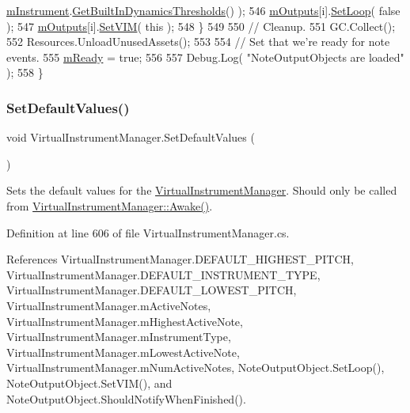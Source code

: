 \begin{DoxyCode}
      \hyperlink{group___v_i_m_priv_gaed435d1f9be09864846db4322dc21fd1}{mInstrument}.\hyperlink{group___v_i_base_pub_func_gac8fc20c49c1b97b6787ed1b3e0073a7f}{GetBuiltInDynamicsThresholds}() );
546             \hyperlink{group___v_i_m_priv_ga53f837fd01475fa35629a650e7fa00e3}{mOutputs}[i].\hyperlink{group___n_o_o_pub_func_ga7b79bbd2c7a68831b322edff140f29d2}{SetLoop}( \textcolor{keyword}{false} );
547             \hyperlink{group___v_i_m_priv_ga53f837fd01475fa35629a650e7fa00e3}{mOutputs}[i].\hyperlink{group___n_o_o_pub_func_gaca261a6f8d95fc7f81bbc3c8108bad58}{SetVIM}( \textcolor{keyword}{this} );
548         \}
549 
550         \textcolor{comment}{// Cleanup.}
551         GC.Collect();
552         Resources.UnloadUnusedAssets();
553 
554         \textcolor{comment}{// Set that we're ready for note events.}
555         \hyperlink{group___v_i_m_priv_ga983a11920bf16794735cc193c327ac42}{mReady} = \textcolor{keyword}{true};
556 
557         Debug.Log( \textcolor{stringliteral}{"NoteOutputObjects are loaded"} );
558     \}
\end{DoxyCode}
\mbox{\label{group___v_i_m_priv_func_gaa9e05e51f025afb0ab5cb2a8532c8bba}} 
\subsubsection{\texorpdfstring{Set\+Default\+Values()}{SetDefaultValues()}}
{\footnotesize\ttfamily void Virtual\+Instrument\+Manager.\+Set\+Default\+Values (\begin{DoxyParamCaption}{ }\end{DoxyParamCaption})\hspace{0.3cm}{\ttfamily [private]}}



Sets the default values for the \hyperlink{class_virtual_instrument_manager}{Virtual\+Instrument\+Manager}. Should only be called from \hyperlink{group___v_i_m_unity_gab92bac4e22476ffe39fc40f49fbd6ae5}{Virtual\+Instrument\+Manager\+::\+Awake()}. 



Definition at line 606 of file Virtual\+Instrument\+Manager.\+cs.



References Virtual\+Instrument\+Manager.\+D\+E\+F\+A\+U\+L\+T\+\_\+\+H\+I\+G\+H\+E\+S\+T\+\_\+\+P\+I\+T\+CH, Virtual\+Instrument\+Manager.\+D\+E\+F\+A\+U\+L\+T\+\_\+\+I\+N\+S\+T\+R\+U\+M\+E\+N\+T\+\_\+\+T\+Y\+PE, Virtual\+Instrument\+Manager.\+D\+E\+F\+A\+U\+L\+T\+\_\+\+L\+O\+W\+E\+S\+T\+\_\+\+P\+I\+T\+CH, Virtual\+Instrument\+Manager.\+m\+Active\+Notes, Virtual\+Instrument\+Manager.\+m\+Highest\+Active\+Note, Virtual\+Instrument\+Manager.\+m\+Instrument\+Type, Virtual\+Instrument\+Manager.\+m\+Lowest\+Active\+Note, Virtual\+Instrument\+Manager.\+m\+Num\+Active\+Notes, Note\+Output\+Object.\+Set\+Loop(), Note\+Output\+Object.\+Set\+V\+I\+M(), and Note\+Output\+Object.\+Should\+Notify\+When\+Finished().



